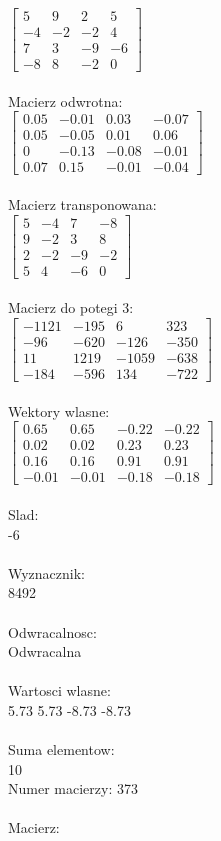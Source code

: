 \documentclass[a4paper,12pt]{article}
\begin{document}
$\begin{bmatrix} 5&9&2&5\\-4&-2&-2&4\\7&3&-9&-6\\-8&8&-2&0 \end{bmatrix}$
\\
\\
Macierz odwrotna:\\

$\begin{bmatrix} 0.05&-0.01&0.03&-0.07\\0.05&-0.05&0.01&0.06\\0&-0.13&-0.08&-0.01\\0.07&0.15&-0.01&-0.04 \end{bmatrix}$
\\
\\
Macierz transponowana:\\

$\begin{bmatrix} 5&-4&7&-8\\9&-2&3&8\\2&-2&-9&-2\\5&4&-6&0 \end{bmatrix}$
\\
\\
Macierz do potegi 3:\\

$\begin{bmatrix} -1121&-195&6&323\\-96&-620&-126&-350\\11&1219&-1059&-638\\-184&-596&134&-722 \end{bmatrix}$
\\
\\
Wektory wlasne:\\

$\begin{bmatrix} 0.65&0.65&-0.22&-0.22\\0.02&0.02&0.23&0.23\\0.16&0.16&0.91&0.91\\-0.01&-0.01&-0.18&-0.18 \end{bmatrix}$
\\
\\
Slad:\\
-6
\\
\\
Wyznacznik:\\
8492
\\
\\
Odwracalnosc:\\
Odwracalna
\\
\\
Wartosci wlasne:\\
5.73 5.73 -8.73 -8.73
\\
\\
Suma elementow:\\
10
\\
\newpage
Numer macierzy:
373
\\
\\
Macierz:\\
\end{document}
